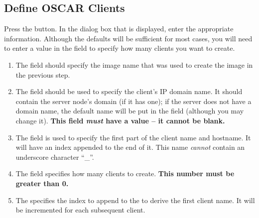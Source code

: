 
\subsection{Define OSCAR Clients}
\label{det:define-clients}

Press the  button.  In the dialog box
that is displayed, enter the appropriate information.  Although the
defaults will be sufficient for most cases, you will need to enter a
value in the  field to specify how many clients
you want to create.

\begin{enumerate}

\item The  field should specify the image name that
  was used to create the image in the previous step.

\item The  field should be used to specify the
  client's IP domain name.
%
  It should contain the server node's domain (if it has one); if the
  server does not have a domain name, the default name
   will be put in the field (although you may
  change it).
%
  {\bf This field \emph{must} have a value -- it cannot be blank.}
%

\item The  field is used to specify the first part of
  the client name and hostname. It will have an index appended to the
  end of it. This name \emph{cannot} contain an underscore
  character ``\_''.

\item The  field specifies how many clients to
  create.  {\bf This number must be greater than 0.}

\item The  specifies the index to append to the
   to derive the first client name. It will be
  incremented for each subsequent client.


\end{enumerate}
